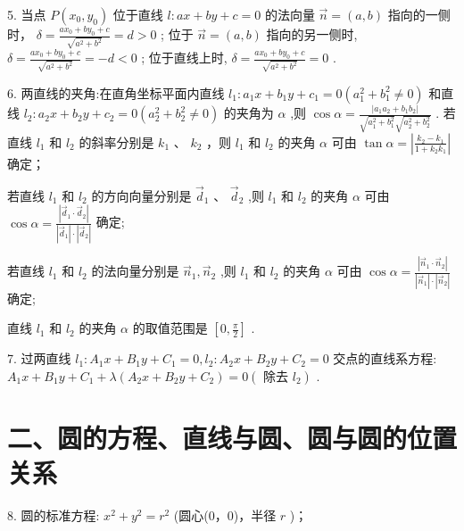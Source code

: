 5. 当点 $P\left( {{x}_{0},{y}_{0}}\right)$ 位于直线 $l : {ax} + {by} + c = 0$ 的法向量 $\overrightarrow{n} = \left( {a,b}\right)$ 指向的一侧时， $\delta  = \frac{a{x}_{0} + b{y}_{0} + c}{\sqrt{{a}^{2} + {b}^{2}}} =  d > 0$ ; 位于 $\overrightarrow{n} = \left( {a,b}\right)$ 指向的另一侧时, $\delta  = \frac{a{x}_{0} + b{y}_{0} + c}{\sqrt{{a}^{2} + {b}^{2}}} =  - d < 0$ ; 位于直线上时, $\delta  = \frac{a{x}_{0} + b{y}_{0} + c}{\sqrt{{a}^{2} + {b}^{2}}} = 0$ .

6. 两直线的夹角:在直角坐标平面内直线 ${l}_{1} : {a}_{1}x + {b}_{1}y + {c}_{1} = 0\left( {{a}_{1}^{2} + {b}_{1}^{2} \neq  0}\right)$ 和直线 ${l}_{2} : {a}_{2}x + {b}_{2}y + {c}_{2} =  0\left( {{a}_{2}^{2} + {b}_{2}^{2} \neq  0}\right)$ 的夹角为 $\alpha$ ,则 $\cos \alpha  = \frac{\left| {a}_{1}{a}_{2} + {b}_{1}{b}_{2}\right| }{\sqrt{{a}_{1}^{2} + {b}_{1}^{2}}\sqrt{{a}_{2}^{2} + {b}_{2}^{2}}}$ . 若直线 ${l}_{1}$ 和 ${l}_{2}$ 的斜率分别是 ${k}_{1}$ 、 ${k}_{2}$ ，则 ${l}_{1}$ 和 ${l}_{2}$ 的夹角 $\alpha$ 可由 $\tan \alpha  = \left| \frac{{k}_{2} - {k}_{1}}{1 + {k}_{2}{k}_{1}}\right|$ 确定；

若直线 ${l}_{1}$ 和 ${l}_{2}$ 的方向向量分别是 ${\overrightarrow{d}}_{1}\text{ 、 }{\overrightarrow{d}}_{2}$ ,则 ${l}_{1}$ 和 ${l}_{2}$ 的夹角 $\alpha$ 可由 $\cos \alpha  = \frac{\left| {\overrightarrow{d}}_{1} \cdot  {\overrightarrow{d}}_{2}\right| }{\left| {\overrightarrow{d}}_{1}\right|  \cdot  \left| {\overrightarrow{d}}_{2}\right| }$ 确定;

若直线 ${l}_{1}$ 和 ${l}_{2}$ 的法向量分别是 ${\overrightarrow{n}}_{1},{\overrightarrow{n}}_{2}$ ,则 ${l}_{1}$ 和 ${l}_{2}$ 的夹角 $\alpha$ 可由 $\cos \alpha  = \frac{\left| {\overrightarrow{n}}_{1} \cdot  {\overrightarrow{n}}_{2}\right| }{\left| {\overrightarrow{n}}_{1}\right|  \cdot  \left| {\overrightarrow{n}}_{2}\right| }$ 确定;

直线 ${l}_{1}$ 和 ${l}_{2}$ 的夹角 $\alpha$ 的取值范围是 $\left\lbrack  {0,\frac{\pi }{2}}\right\rbrack$ .

7. 过两直线 ${l}_{1} : {A}_{1}x + {B}_{1}y + {C}_{1} = 0,{l}_{2} : {A}_{2}x + {B}_{2}y + {C}_{2} = 0$ 交点的直线系方程: ${A}_{1}x + {B}_{1}y + {C}_{1} +  \lambda \left( {{A}_{2}x + {B}_{2}y + {C}_{2}}\right)  = 0\left( {\text{ 除去 }{l}_{2}}\right)$ .

\section*{二、圆的方程、直线与圆、圆与圆的位置关系}

8. 圆的标准方程: ${x}^{2} + {y}^{2} = {r}^{2}$ (圆心(0，0)，半径 $r$ )；

